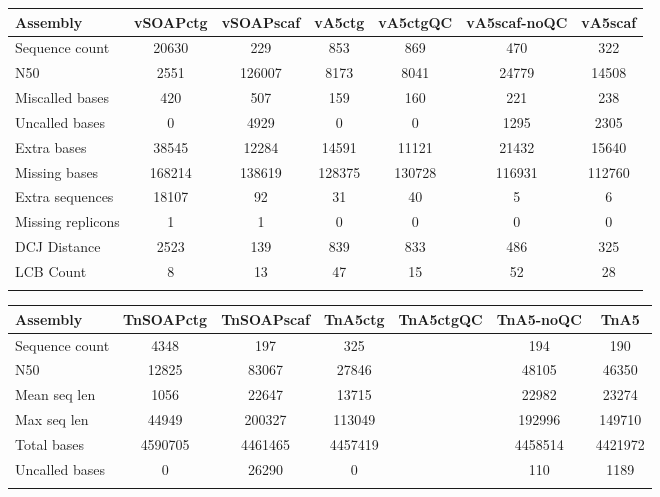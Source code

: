 \documentclass{bioinfo}
\begin{document}





\begin{table}[!t] 
{\begin{tabular}{l|cccccc}\toprule
Assembly           & vSOAPctg & vSOAPscaf & vA5ctg & vA5ctgQC & vA5scaf-noQC & vA5scaf  \\\midrule
Sequence count     & 20630    & 229       & 853       & 869         & 470          & 322         \\
N50                & 2551     & 126007    & 8173      & 8041        & 24779        & 14508       \\
Miscalled bases    & 420      & 507       & 159       & 160         & 221          & 238         \\
Uncalled bases     & 0        & 4929      & 0         & 0           & 1295         & 2305        \\
Extra bases        & 38545    & 12284     & 14591     & 11121       & 21432        & 15640       \\
Missing bases      & 168214   & 138619    & 128375    & 130728      & 116931       & 112760      \\
Extra sequences    & 18107    & 92        & 31        & 40          & 5            & 6           \\
Missing replicons  & 1        & 1         & 0         & 0           & 0            & 0           \\
DCJ Distance       & 2523     & 139       & 839       & 833         & 486          & 325         \\
LCB Count          & 8        & 13        & 47        & 15          & 52           & 28          \\
\botrule \\
\end{tabular}}{}
\end{table}

\begin{table}[!t]
{\begin{tabular}{l|cccccc}\toprule
Assembly        & TnSOAPctg & TnSOAPscaf  & TnA5ctg   & TnA5ctgQC & TnA5-noQC & TnA5    \\\midrule
Sequence count  & 4348      & 197         &  325      &  & 194       & 190     \\
N50             & 12825     & 83067       &  27846    &  & 48105     & 46350   \\
Mean seq len    & 1056      & 22647       &  13715    &  & 22982     & 23274   \\
Max seq len     & 44949     & 200327      &  113049   &  & 192996    & 149710  \\
Total bases     & 4590705   & 4461465     &  4457419  &  & 4458514   & 4421972 \\
Uncalled bases  & 0         & 26290       &  0        &  & 110       & 1189    \\
\botrule \\
\end{tabular}}{}
\end{table}
\end{document}
